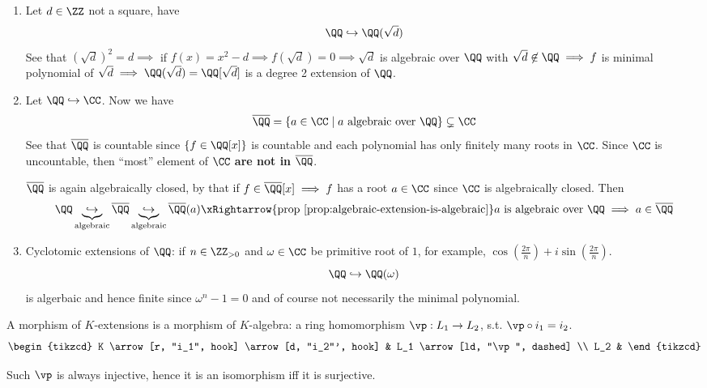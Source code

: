 \begin{eg}
	\leavevmode
	\begin{enumerate}
		\item Let \( d\in \ZZ \) not a square, have
		      \[
			      \QQ \hookrightarrow \QQ(\sqrt{d})
		      \]
		      See that \( (\sqrt{d})^2 = d \implies \) if \( f(x) = x^2 - d \implies f(\sqrt{d}) = 0
		      \implies \sqrt{d} \) is algebraic over \( \QQ \) with \( \sqrt{d} \not\in \QQ \implies f \) is
		      minimal polynomial of \( \sqrt{d} \implies \QQ(\sqrt{d}) = \QQ[\sqrt{d}] \) is a degree 2
		      extension of \( \QQ \).
		\item Let \( \QQ \hookrightarrow \CC \). Now we have
		      \[
			      \overline{\QQ} = \{a\in \CC \; | \; a \text{ algebraic over } \QQ\} \subsetneq \CC
		      \]
		      See that \( \overline{\QQ} \) is countable since \( \{f \in \QQ[x]\} \) is countable and each
		      polynomial has only finitely many roots in \( \CC \). Since \( \CC \) is uncountable, then
		      ``most'' element of \( \CC \) \textbf{are not in} \( \overline{\QQ} \).

		      \begin{note}
			      \( \overline{\QQ} \) is again algebraically closed, by that if \( f \in \overline{\QQ}[x] \implies f  \)
			      has a root \( a\in \CC \) since \( \CC \) is algebraically closed. Then
			      \[
				      \QQ \underbrace{\hookrightarrow}_{\text{algebraic}} \overline{\QQ} \underbrace{\hookrightarrow}_{\text{algebraic}}
				      \overline{\QQ}(a) \xRightarrow{\text{prop \ref{prop:algebraic-extension-is-algebraic}}}
				      a \text{ is algebraic over } \QQ \implies a\in \overline{\QQ}
			      \]
		      \end{note}
		\item Cyclotomic extensions of \( \QQ \): if \( n \in \ZZ_{>0} \) and \( \omega \in \CC \) be
		      primitive root of \( 1 \), for example, \( \cos(\frac{2\pi}{n}) + i \sin (\frac{2\pi}{n}) \).
		      \[
			      \QQ \hookrightarrow \QQ(\omega)
		      \]
		      is algerbaic and hence finite since \( \omega^n - 1 = 0 \) and of course not necessarily the minimal polynomial.
	\end{enumerate}
\end{eg}

\begin{definition}
	A morphism of \( K \)-extensions is a morphism of \( K \)-algebra: a ring homomorphism \( \vp :
	L_1 \to L_2 \), s.t. \( \vp \circ i_1 = i_2 \).
	\[
		\begin{tikzcd}
			K \arrow[r, "i_1", hook] \arrow[d, "i_2"', hook] & L_1 \arrow[ld, "\vp", dashed] \\
			L_2 &
		\end{tikzcd}
	\]
	\begin{note}
		Such \( \vp \) is always injective, hence it is an isomorphism iff it is surjective.
	\end{note}
\end{definition}

